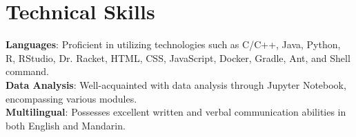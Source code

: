 \documentclass[letterpaper,11pt]{article}
\begin{document}
%
\section{Technical Skills}
 \begin{itemize}[leftmargin=0.15in, label={}]
    \small{\item{
     \textbf{Languages}{: Proficient in utilizing technologies such as C/C++, Java, Python, R, RStudio, Dr. Racket, HTML, CSS, JavaScript, Docker, Gradle, Ant, and Shell command.} \\
     \textbf{Data Analysis}{: Well-acquainted with data analysis through Jupyter Notebook, encompassing various modules.} \\
     \textbf{Multilingual}{: Possesses excellent written and verbal communication abilities in both English and Mandarin.}
    }}
 \end{itemize}


\end{document}
